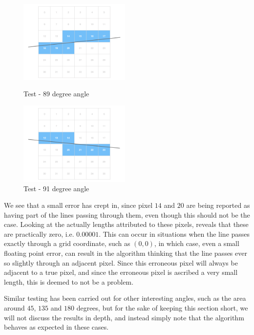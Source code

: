 \begin{figure}[H]
    \centering
    \begin{minipage}[b]{0.49\textwidth}
        \centering
        \includegraphics[width=0.49\textwidth]{figures/test_89.png}
        \caption{Test - 89 degree angle}\label{test89}
    \end{minipage}
    \begin{minipage}[b]{0.49\textwidth}
        \centering
        \includegraphics[width=0.49\textwidth]{figures/test_91.png}
        \caption{Test - 91 degree angle}\label{test91}
    \end{minipage}
\end{figure}
We see that a small error has crept in, since pixel $14$ and $20$ are being reported as having part of the lines passing through them, even though this should not be the case. Looking at the actually lengths attributed to these pixels, reveals that these are practically zero, i.e. $0.00001$. This can occur in situations when the line passes exactly through a grid coordinate, such as $(0,0)$, in which case, even a small floating point error, can result in the algorithm thinking that the line passes ever so slightly through an adjacent pixel. Since this erroneous pixel will always be adjacent to a true pixel, and since the erroneous pixel is ascribed a very small length, this is deemed to not be a problem.

Similar testing has been carried out for other interesting angles, such as the area around $45$, $135$ and $180$ degrees, but for the sake of keeping this section short, we will not discuss the results in depth, and instead simply note that the algorithm behaves as expected in these cases. 
